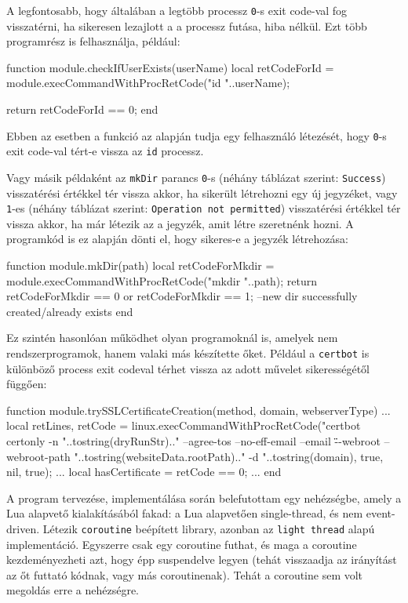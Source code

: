 A legfontosabb, hogy általában a legtöbb processz \texttt{0}-s exit code-val fog visszatérni, ha sikeresen lezajlott a a processz futása, hiba nélkül. Ezt több programrész is felhasználja, például:

\begin{lua}
function module.checkIfUserExists(userName)
    local retCodeForId = module.execCommandWithProcRetCode("id "..userName);

    return retCodeForId == 0;
end
\end{lua}

Ebben az esetben a \texttt{} funkció az alapján tudja egy felhasználó létezését, hogy \texttt{0}-s exit code-val tért-e vissza az \texttt{id} processz.

Vagy másik példaként az \texttt{mkDir} parancs \texttt{0}-s (néhány táblázat szerint: \texttt{Success}) visszatérési értékkel tér vissza akkor, ha sikerült létrehozni egy új jegyzéket, vagy \texttt{1}-es (néhány táblázat szerint: \texttt{Operation not permitted}) visszatérési értékkel tér vissza akkor, ha már létezik az a jegyzék, amit létre szeretnénk hozni. A programkód is ez alapján dönti el, hogy sikeres-e a jegyzék létrehozása:
\begin{lua}
function module.mkDir(path)
    local retCodeForMkdir = module.execCommandWithProcRetCode("mkdir "..path);
    return retCodeForMkdir == 0 or retCodeForMkdir == 1; --new dir successfully created/already exists
end
\end{lua}

Ez szintén hasonlóan működhet olyan programoknál is, amelyek nem rendszerprogramok, hanem valaki más készítette őket. Például a \texttt{certbot} is különböző process exit codeval térhet vissza az adott művelet sikerességétől függően:
\begin{lua}
function module.trySSLCertificateCreation(method, domain, webserverType)
    ...
    local retLines, retCode = linux.execCommandWithProcRetCode("certbot certonly -n "..tostring(dryRunStr).." --agree-tos --no-eff-email --email \"\" --webroot --webroot-path "..tostring(websiteData.rootPath).." -d "..tostring(domain), true, nil, true);
    ...
    local hasCertificate = retCode == 0;
    ...
end
\end{lua}

\pagebreak
{}

A program tervezése, implementálása során belefutottam egy nehézségbe, amely a Lua alapvető kialakításából fakad: a Lua alapvetően single-thread, és nem event-driven. Létezik \texttt{coroutine} beépített library, azonban az \texttt{light thread} alapú implementáció. Egyszerre csak egy coroutine futhat, és maga a coroutine kezdeményezheti azt, hogy épp suspendelve legyen (tehát visszaadja az irányítást az őt futtató kódnak, vagy más coroutinenak). Tehát a coroutine sem volt megoldás erre a nehézségre.

